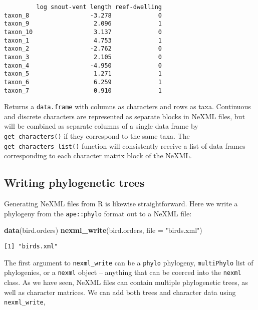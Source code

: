 \documentclass[author-year, review, 11pt]{components/elsarticle} %
\newenvironment{Shaded}{\begin{snugshade}}{\end{snugshade}}
\newcommand{\KeywordTok}[1]{\textcolor[rgb]{0.13,0.29,0.53}{\textbf{{#1}}}}
\newcommand{\DataTypeTok}[1]{\textcolor[rgb]{0.13,0.29,0.53}{{#1}}}
\newcommand{\StringTok}[1]{\textcolor[rgb]{0.31,0.60,0.02}{{#1}}}
\newcommand{\NormalTok}[1]{{#1}}
\begin{document}
\begin{verbatim}
         log snout-vent length reef-dwelling
taxon_8                 -3.278             0
taxon_9                  2.096             1
taxon_10                 3.137             0
taxon_1                  4.753             1
taxon_2                 -2.762             0
taxon_3                  2.105             0
taxon_4                 -4.950             0
taxon_5                  1.271             1
taxon_6                  6.259             1
taxon_7                  0.910             1
\end{verbatim}

Returns a \texttt{data.frame} with columns as characters and rows as
taxa. Continuous and discrete characters are represented as separate
blocks in NeXML files, but will be combined as separate columns of a
single data frame by \texttt{get\_characters()} if they correspond to
the same taxa. The \texttt{get\_characters\_list()} function will
consistently receive a list of data frames corresponding to each
character matrix block of the NeXML.

\subsection{Writing phylogenetic
trees}\label{writing-phylogenetic-trees}

Generating NeXML files from R is likewise straightforward. Here we write
a phylogeny from the \texttt{ape::phylo} format out to a NeXML file:

\begin{Shaded}
\begin{Highlighting}[]
\KeywordTok{data}\NormalTok{(bird.orders)}
\KeywordTok{nexml_write}\NormalTok{(bird.orders, }\DataTypeTok{file =} \StringTok{"birds.xml"}\NormalTok{)}
\end{Highlighting}
\end{Shaded}

\begin{verbatim}
[1] "birds.xml"
\end{verbatim}

The first argument to \texttt{nexml\_write} can be a \texttt{phylo}
phylogeny, \texttt{multiPhylo} list of phylogenies, or a \texttt{nexml}
object -- anything that can be coerced into the \texttt{nexml} class. As
we have seen, NeXML files can contain multiple phylogenetic trees, as
well as character matrices. We can add both trees and character data
using \texttt{nexml\_write},
\end{document}
